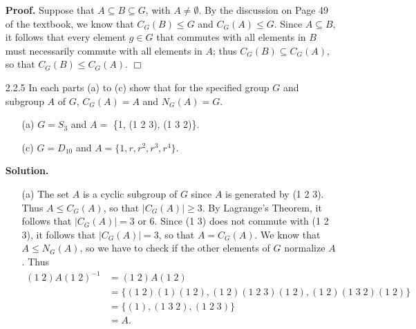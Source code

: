 \documentclass[9pt]{article}
\newcommand{\qed}{\hfill \ensuremath{\Box}}
\begin{document}
\begin{enumerate}
      \textbf{Proof.} Suppose that $A \subseteq B \subseteq G$, with
      $A \neq \emptyset$. By the discussion on Page 49 of the textbook, we know
      that $C_G(B) \le G$ and $C_G(A) \le G$. Since $A \subseteq B$, it follows
      that every element $g \in G$ that commutes with all elements in $B$ must
      necessarily commute with all elements in $A$; thus
      $C_G(B) \subseteq C_G(A)$, so that $C_G(B) \le C_G(A)$. \qed
   \item[2.2.5]   In each parts (a) to (c) show that for the specified group $G$
                  and subgroup $A$ of $G$, $C_G(A) = A$ and $N_G(A) = G$.
                  \begin{enumerate}
                     \item[(a)]  $G = S_3$ and $A = $ \{1, (1 2 3), (1 3 2)\}.
                     \item[(c)]  $G = D_{10}$ and $A = \{1, r, r^2, r^3, r^4\}$.
                  \end{enumerate}
      
      \textbf{Solution.}
      
      \begin{enumerate}
         \item[(a)]
               The set $A$ is a cyclic subgroup of $G$ since $A$ is generated by
               (1 2 3). Thus $A \le C_G(A)$, so that $|C_G(A)| \ge 3$. By
               Lagrange's Theorem, it follows that $|C_G(A)| = 3$ or 6. Since
               (1 3) does not commute with (1 2 3), it follows that
               $|C_G(A)| = 3$, so that $A = C_G(A)$. We know that
               $A \le N_G(A)$, so we have to check if the other elements of $G$
               normalize $A$. Thus
               \begin{align*}
                  (1\;2)A(1\;2)^{-1} &= (1\;2)A(1\;2) \\
                     &= \{(1\;2)(1)(1\;2), (1\;2)(1\;2\;3)(1\;2),
                          (1\;2)(1\;3\;2)(1\;2)\} \\
                     &= \{(1), (1\;3\;2), (1\;2\;3)\} \\
                     &= A.
               \end{align*}
               

\end{enumerate}
\end{enumerate}
\end{document}
